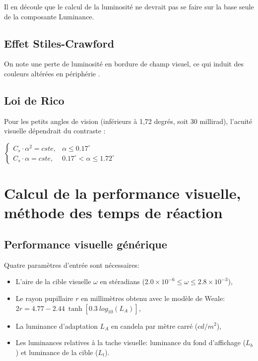 		Il en découle que le calcul de la luminosité ne devrait pas se faire sur la base seule de la composante Luminance.
		
		\section*{Effet Stiles-Crawford}
		\par On note une perte de luminosité en bordure de champ visuel, ce qui induit des couleurs altérées en périphérie \citep{damelincourt_eclairage_2010}.
		
		\section*{Loi de Rico}		
		\par Pour les petits angles de vision (inférieurs à 1,72 degrés, soit 30 millirad), l'acuité visuelle dépendrait du contraste \citep{damelincourt_eclairage_2010}:
		
		$\begin{cases}
			C_s \cdot \alpha^2 = cste, & \alpha \leq 0.17^\circ\\
			C_s \cdot \alpha = cste, & 0.17^\circ < \alpha \leq 1.72^\circ
		\end{cases}$	
	
	\chapter*{Calcul de la performance visuelle, méthode des temps de réaction}
	
	\section*{Performance visuelle générique}
	\par Quatre paramètres d'entrée sont nécessaires:
	\begin{itemize}
		\item L'aire de la cible visuelle $\omega$ en stéradians ($2.0 \times 10^{-6} \leq \omega \leq 2.8 \times 10^{-3}$),
		\item Le rayon pupillaire $r$ en millimètres obtenu avec le modèle de Weale: $2r = 4.77 - 2.44~\tanh[0.3~log_{10}(L_A)]$,
		\item La luminance d'adaptation $L_A$ en candela par mètre carré ($cd/m^2$),
		\item Les luminances relatives à la tache visuelle: luminance du fond d'affichage ($L_b$) et luminance de la cible ($L_t$).
	\end{itemize}	
	
